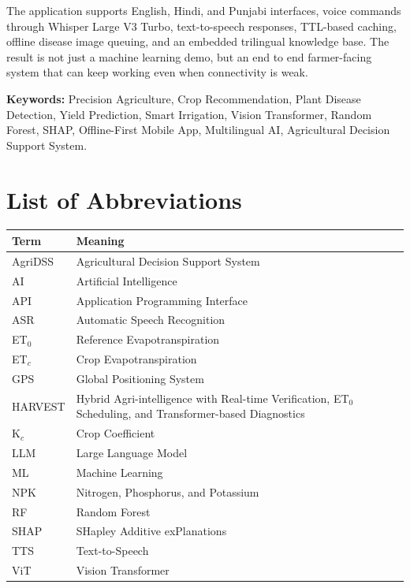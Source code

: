 \documentclass[12pt,a4paper]{report}
\begin{document}
The application supports English, Hindi, and Punjabi interfaces, voice commands through Whisper Large V3 Turbo, text-to-speech responses, TTL-based caching, offline disease image queuing, and an embedded trilingual knowledge base. The result is not just a machine learning demo, but an end to end farmer-facing system that can keep working even when connectivity is weak.

\singlespacing
\vspace{0.8cm}
\noindent\textbf{Keywords:} Precision Agriculture, Crop Recommendation, Plant Disease Detection, Yield Prediction, Smart Irrigation, Vision Transformer, Random Forest, SHAP, Offline-First Mobile App, Multilingual AI, Agricultural Decision Support System.

\tableofcontents
\listoffigures
\listoftables
\clearpage

\chapter*{List of Abbreviations}
\begin{table}[H]
\centering
\begin{tabular}{p{3cm}p{10cm}}
\toprule
\textbf{Term} & \textbf{Meaning} \\
\midrule
AgriDSS & Agricultural Decision Support System \\
AI & Artificial Intelligence \\
API & Application Programming Interface \\
ASR & Automatic Speech Recognition \\
ET$_0$ & Reference Evapotranspiration \\
ET$_c$ & Crop Evapotranspiration \\
GPS & Global Positioning System \\
HARVEST & Hybrid Agri-intelligence with Real-time Verification, ET$_0$ Scheduling, and Transformer-based Diagnostics \\
K$_c$ & Crop Coefficient \\
LLM & Large Language Model \\
ML & Machine Learning \\
NPK & Nitrogen, Phosphorus, and Potassium \\
RF & Random Forest \\
SHAP & SHapley Additive exPlanations \\
TTS & Text-to-Speech \\
ViT & Vision Transformer \\
\bottomrule
\end{tabular}
\end{table}
\clearpage
\end{document}
